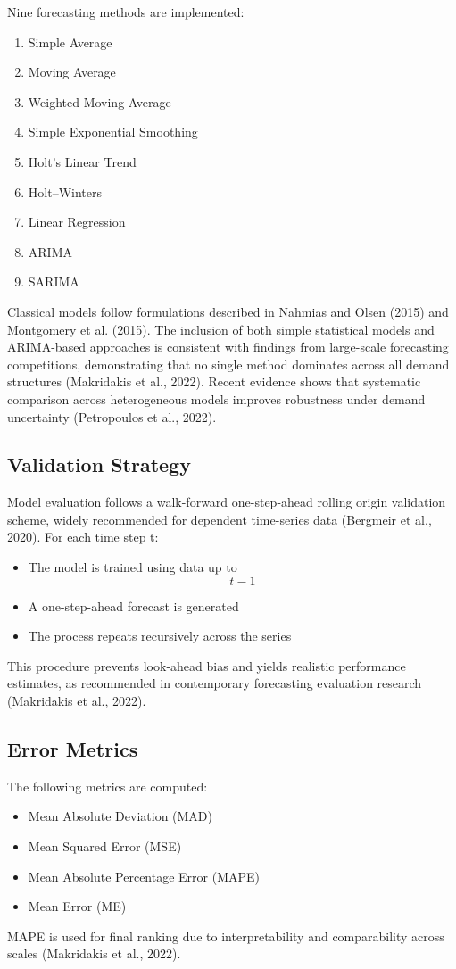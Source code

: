 \documentclass[journal,article,submit,pdftex,moreauthors]{Definitions/mdpi}
\begin{document}
Nine forecasting methods are implemented:
\begin{enumerate}
\item Simple Average
\item Moving Average
\item Weighted Moving Average
\item Simple Exponential Smoothing
\item Holt’s Linear Trend
\item Holt–Winters
\item Linear Regression
\item ARIMA
\item SARIMA
\end{enumerate}
Classical models follow formulations described in Nahmias and Olsen (2015) and Montgomery et al. (2015).
The inclusion of both simple statistical models and ARIMA-based approaches is consistent with findings from large-scale forecasting competitions, demonstrating that no single method dominates across all demand structures (Makridakis et al., 2022).
Recent evidence shows that systematic comparison across heterogeneous models improves robustness under demand uncertainty (Petropoulos et al., 2022).

\subsection {Validation Strategy}

Model evaluation follows a walk-forward one-step-ahead rolling origin validation scheme, widely recommended for dependent time-series data (Bergmeir et al., 2020).
For each time step t:
\begin{itemize}
\item The model is trained using data up to \begin{equation} t-1 \end{equation}
\item A one-step-ahead forecast is generated
\item The process repeats recursively across the series
\end{itemize}
This procedure prevents look-ahead bias and yields realistic performance estimates, as recommended in contemporary forecasting evaluation research (Makridakis et al., 2022).

\subsection {Error Metrics}
The following metrics are computed:
\begin{itemize}
\item Mean Absolute Deviation (MAD)
\item Mean Squared Error (MSE)
\item Mean Absolute Percentage Error (MAPE)
\item Mean Error (ME)
\end{itemize}
MAPE is used for final ranking due to interpretability and comparability across scales (Makridakis et al., 2022).
\end{document}
